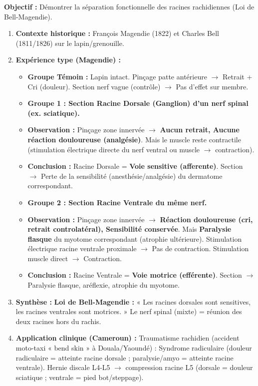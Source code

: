 \documentclass[11pt]{article}
\begin{document}
\begin{methode}
\textbf{Objectif :} Démontrer la séparation fonctionnelle des racines rachidiennes (Loi de Bell-Magendie).
\begin{enumerate}
    \item \textbf{Contexte historique :} François Magendie (1822) et Charles Bell (1811/1826) sur le lapin/grenouille.
    \item \textbf{Expérience type (Magendie) :}
    \begin{itemize}
        \item \textbf{Groupe Témoin :} Lapin intact. Pinçage patte antérieure $\rightarrow$ Retrait + Cri (douleur). Section nerf vague (contrôle) $\rightarrow$ Pas d'effet sur membre.
        \item \textbf{Groupe 1 : Section Racine Dorsale (Ganglion) d'un nerf spinal (ex. sciatique).}
        \item \textbf{Observation :} Pinçage zone innervée $\rightarrow$ \textbf{Aucun retrait, Aucune réaction douloureuse (analgésie)}. Mais le muscle reste contractile (stimulation électrique directe du nerf ventral ou muscle $\rightarrow$ contraction).
        \item \textbf{Conclusion :} Racine Dorsale = \textbf{Voie sensitive (afferente)}. Section $\rightarrow$ Perte de la sensibilité (anesthésie/analgésie) du dermatome correspondant.
        \item \textbf{Groupe 2 : Section Racine Ventrale du même nerf.}
        \item \textbf{Observation :} Pinçage zone innervée $\rightarrow$ \textbf{Réaction douloureuse (cri, retrait controlatéral), Sensibilité conservée}. Mais \textbf{Paralysie flasque} du myotome correspondant (atrophie ultérieure). Stimulation électrique racine ventrale proximale $\rightarrow$ Pas de contraction. Stimulation muscle direct $\rightarrow$ Contraction.
        \item \textbf{Conclusion :} Racine Ventrale = \textbf{Voie motrice (efférente)}. Section $\rightarrow$ Paralysie flasque, aréflexie, atrophie du myotome.
    \end{itemize}
    \item \textbf{Synthèse :} \textbf{Loi de Bell-Magendie :} « Les racines dorsales sont sensitives, les racines ventrales sont motrices. » Le nerf spinal (mixte) = réunion des deux racines hors du rachis.
    \item \textbf{Application clinique (Cameroun) :} Traumatisme rachidien (accident moto-taxi « bend skin » à Douala/Yaoundé) : Syndrome radiculaire (douleur radiculaire = atteinte racine dorsale ; paralysie/amyo = atteinte racine ventrale). Hernie discale L4-L5 $\rightarrow$ compression racine L5 (dorsale = douleur sciatique ; ventrale = pied bot/steppage).
\end{enumerate}
\end{methode}
\end{document}
